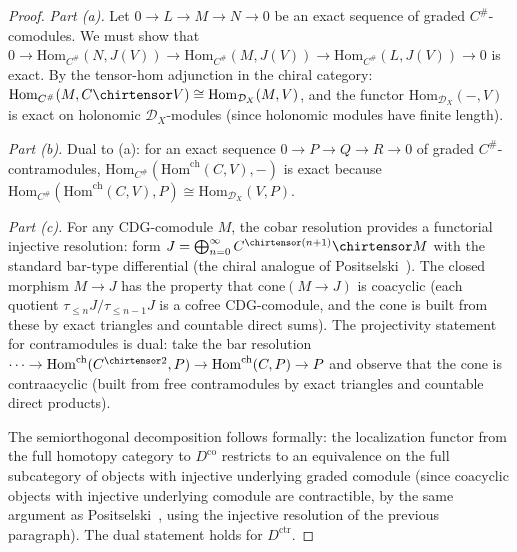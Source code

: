\begin{proof}
\emph{Part (a).}
Let $0 \to L \to M \to N \to 0$ be an exact sequence of graded
$C^{\#}$-comodules.  We must show that
$0 \to \mathrm{Hom}_{C^{\#}}(N, J(V)) \to \mathrm{Hom}_{C^{\#}}(M, J(V))
\to \mathrm{Hom}_{C^{\#}}(L, J(V)) \to 0$
is exact.  By the tensor-hom adjunction in the chiral category:
$\mathrm{Hom}_{C^{\#}}(M, C \chirtensor V)
\cong \mathrm{Hom}_{\mathcal{D}_X}(M, V)$,
and the functor $\mathrm{Hom}_{\mathcal{D}_X}(-, V)$ is exact
on holonomic $\mathcal{D}_X$-modules (since holonomic modules have
finite length).

\emph{Part (b).}
Dual to (a): for an exact sequence
$0 \to P \to Q \to R \to 0$ of graded $C^{\#}$-contramodules,
$\mathrm{Hom}_{C^{\#}}(\mathrm{Hom}^{\mathrm{ch}}(C, V), -)$
is exact because
$\mathrm{Hom}_{C^{\#}}(\mathrm{Hom}^{\mathrm{ch}}(C, V), P)
\cong \mathrm{Hom}_{\mathcal{D}_X}(V, P)$.

\emph{Part (c).}
For any CDG-comodule $M$, the cobar resolution provides a
functorial injective resolution: form
$J = \bigoplus_{n=0}^{\infty} C^{\chirtensor (n+1)} \chirtensor M$
with the standard bar-type differential (the chiral analogue of
Positselski~\cite[\S4.4, proof of Theorem]{Positselski11}).
The closed morphism $M \to J$ has the property that
$\mathrm{cone}(M \to J)$ is coacyclic (each quotient
$\tau_{\leq n}J / \tau_{\leq n-1}J$ is a cofree CDG-comodule, and
the cone is built from these by exact triangles and countable direct
sums).  The projectivity statement for contramodules is dual:
take the bar resolution
$\cdots \to \mathrm{Hom}^{\mathrm{ch}}(C^{\chirtensor 2}, P)
\to \mathrm{Hom}^{\mathrm{ch}}(C, P) \to P$
and observe that the cone is contraacyclic (built from free
contramodules by exact triangles and countable direct products).

The semiorthogonal decomposition follows formally: the localization
functor from the full homotopy category to $D^{\mathrm{co}}$
restricts to an equivalence on the full subcategory of objects with
injective underlying graded comodule (since coacyclic objects with
injective underlying comodule are contractible, by the same argument as
Positselski~\cite[\S4.4]{Positselski11}, using the injective
resolution of the previous paragraph).  The dual statement holds for
$D^{\mathrm{ctr}}$.
\end{proof}

